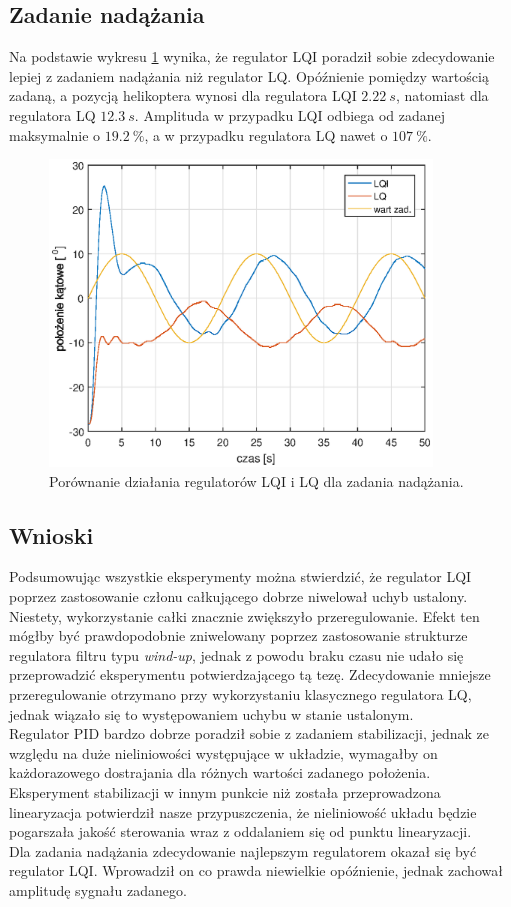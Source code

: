 \documentclass[11pt,a4paper]{article}
\begin{document}
\subsection{Zadanie nadążania}
Na podstawie wykresu \ref{fig:por_foll_LQILQ} wynika, że regulator LQI poradził sobie zdecydowanie lepiej z zadaniem nadążania niż regulator LQ. Opóźnienie pomiędzy wartością zadaną, a pozycją helikoptera wynosi dla regulatora LQI $2.22 \ s$, natomiast dla regulatora LQ $12.3 \ s$. Amplituda w przypadku LQI odbiega od zadanej maksymalnie o $19.2 \ \%$, a w przypadku regulatora LQ nawet o $107 \ \%$. 
\begin{figure}[H]
	\centering
	\includegraphics[width=4in]{Figures/por_foll_LQLQI.eps}
	\caption{Porównanie działania regulatorów LQI i LQ dla zadania nadążania.}
	\label{fig:por_foll_LQILQ}
\end{figure}

\subsection{Wnioski}
Podsumowując wszystkie eksperymenty można stwierdzić, że regulator LQI poprzez zastosowanie członu całkującego dobrze niwelował uchyb ustalony. Niestety, wykorzystanie całki znacznie zwiększyło przeregulowanie. Efekt ten mógłby być prawdopodobnie zniwelowany poprzez zastosowanie strukturze regulatora filtru typu \textit{wind-up}, jednak z powodu braku czasu nie udało się przeprowadzić eksperymentu potwierdzającego tą tezę. Zdecydowanie mniejsze przeregulowanie otrzymano przy wykorzystaniu klasycznego regulatora LQ, jednak wiązało się to występowaniem uchybu w stanie ustalonym. \\
Regulator PID bardzo dobrze poradził sobie z zadaniem stabilizacji, jednak ze względu na duże nieliniowości występujące w układzie, wymagałby on każdorazowego dostrajania dla różnych wartości zadanego położenia. \\
Eksperyment stabilizacji w innym punkcie niż została przeprowadzona linearyzacja potwierdził nasze przypuszczenia, że nieliniowość układu będzie pogarszała jakość sterowania wraz z oddalaniem się od punktu linearyzacji.\\
Dla zadania nadążania zdecydowanie najlepszym regulatorem okazał się być regulator LQI. Wprowadził on co prawda niewielkie opóźnienie, jednak zachował amplitudę sygnału zadanego.
\end{document}
